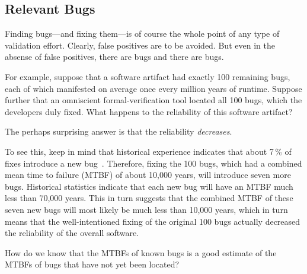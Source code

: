 \subsection{Relevant Bugs}
\label{sec:formal:Relevant Bugs}

Finding bugs---and fixing them---is of course the whole point of any
type of validation effort.
Clearly, false positives are to be avoided.
But even in the absense of false positives, there are bugs and there are bugs.

For example, suppose that a software artifact had exactly 100 remaining
bugs, each of which manifested on average once every million years
of runtime.
Suppose further that an omniscient formal-verification tool located
all 100 bugs, which the developers duly fixed.
What happens to the reliability of this software artifact?

The perhaps surprising answer is that the reliability \emph{decreases}.

To see this, keep in mind that historical experience indicates that
about 7\,\% of fixes introduce a new bug~\cite{RexBlack2012SQA}.
Therefore, fixing the 100 bugs, which had a combined mean time to failure
(MTBF) of about 10,000 years, will introduce seven more bugs.
Historical statistics indicate that each new bug will have an MTBF
much less than 70,000 years.
This in turn suggests that the combined MTBF of these seven new bugs
will most likely be much less than 10,000 years, which in turn means
that the well-intentioned fixing of the original 100 bugs actually
decreased the reliability of the overall software.

\QuickQuiz{}
	How do we know that the MTBFs of known bugs is a good estimate
	of the MTBFs of bugs that have not yet been located?
 \QuickQuizEnd

